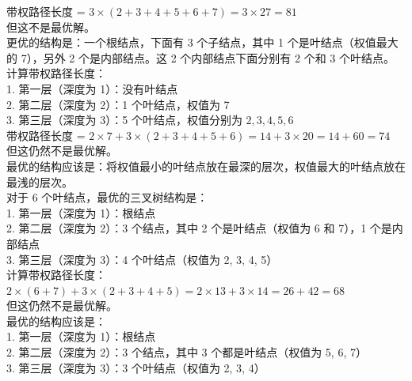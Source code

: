 \documentclass[lang=cn,newtx,10pt,scheme=chinese]{../../../elegantbook}
\begin{document}
\begin{enumerate}
        带权路径长度 = $3 \times (2 + 3 + 4 + 5 + 6 + 7) = 3 \times 27 = 81$\\
        
        但这不是最优解。\\
        
        更优的结构是：一个根结点，下面有 3 个子结点，其中 1 个是叶结点（权值最大的 7），另外 2 个是内部结点。这 2 个内部结点下面分别有 2 个和 3 个叶结点。\\
        
        计算带权路径长度：\\
        1. 第一层（深度为 1）：没有叶结点\\
        2. 第二层（深度为 2）：1 个叶结点，权值为 7\\
        3. 第三层（深度为 3）：5 个叶结点，权值分别为 $2, 3, 4, 5, 6$\\
        
        带权路径长度 = $2 \times 7 + 3 \times (2 + 3 + 4 + 5 + 6) = 14 + 3 \times 20 = 14 + 60 = 74$\\
        
        但这仍然不是最优解。\\
        
        最优的结构应该是：将权值最小的叶结点放在最深的层次，权值最大的叶结点放在最浅的层次。\\
        
        对于 6 个叶结点，最优的三叉树结构是：\\
        1. 第一层（深度为 1）：根结点\\
        2. 第二层（深度为 2）：3 个结点，其中 2 个是叶结点（权值为 6 和 7），1 个是内部结点\\
        3. 第三层（深度为 3）：4 个叶结点（权值为 2, 3, 4, 5）\\
        
        计算带权路径长度：\\
        $2 \times (6 + 7) + 3 \times (2 + 3 + 4 + 5) = 2 \times 13 + 3 \times 14 = 26 + 42 = 68$\\
        
        但这仍然不是最优解。\\
        
        最优的结构应该是：\\
        1. 第一层（深度为 1）：根结点\\
        2. 第二层（深度为 2）：3 个结点，其中 3 个都是叶结点（权值为 5, 6, 7）\\
        3. 第三层（深度为 3）：3 个叶结点（权值为 2, 3, 4）\\
        

\end{enumerate}
\end{document}
